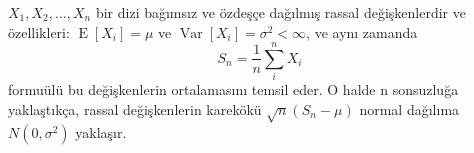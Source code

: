 \documentclass{article}
\begin{document}
$X_1, X_2, \ldots, X_n$ bir dizi bağımsız ve özdeşçe dağılmış
rassal değişkenlerdir ve özellikleri:
$\operatorname{E}[X_i] = \mu$ ve
$\operatorname{Var}[X_i] = \sigma^2 < \infty$, ve aynı zamanda
\begin{equation*}
S_n = \frac{1}{n}\sum_{i}^{n} X_i
\end{equation*}
formuülü bu değişkenlerin ortalamasını temsil eder. O halde 
n sonsuzluğa yaklaştıkça, rassal değişkenlerin karekökü $\sqrt{n}(S_n - \mu)$ 
normal dağılıma $N(0, \sigma^2)$ yaklaşır. 

\end{document}
